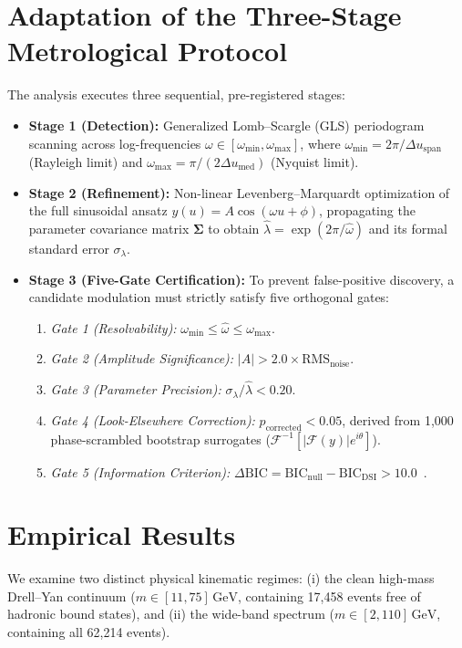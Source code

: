 \documentclass[11pt,a4paper]{article}
\begin{document}
\section{Adaptation of the Three-Stage Metrological Protocol}
The analysis executes three sequential, pre-registered stages:
\begin{itemize}
    \item \textbf{Stage 1 (Detection):} Generalized Lomb--Scargle (GLS) periodogram~\cite{lomb1976,scargle1982} scanning across log-frequencies $\omega \in [\omega_{\min}, \omega_{\max}]$, where $\omega_{\min} = 2\pi / \Delta u_{\text{span}}$ (Rayleigh limit) and $\omega_{\max} = \pi / (2 \Delta u_{\text{med}})$ (Nyquist limit).
    \item \textbf{Stage 2 (Refinement):} Non-linear Levenberg--Marquardt optimization of the full sinusoidal ansatz $y(u) = A \cos(\omega u + \phi)$, propagating the parameter covariance matrix $\boldsymbol{\Sigma}$ to obtain $\hat{\lambda} = \exp(2\pi / \hat{\omega})$ and its formal standard error $\sigma_\lambda$.
    \item \textbf{Stage 3 (Five-Gate Certification):} To prevent false-positive discovery, a candidate modulation must strictly satisfy five orthogonal gates:
    \begin{enumerate}
        \item \textit{Gate 1 (Resolvability):} $\omega_{\min} \le \hat{\omega} \le \omega_{\max}$.
        \item \textit{Gate 2 (Amplitude Significance):} $|A| > 2.0 \times \text{RMS}_{\text{noise}}$.
        \item \textit{Gate 3 (Parameter Precision):} $\sigma_\lambda / \hat{\lambda} < 0.20$.
        \item \textit{Gate 4 (Look-Elsewhere Correction):} $p_{\text{corrected}} < 0.05$, derived from 1,000 phase-scrambled bootstrap surrogates ($\mathcal{F}^{-1}[ |\mathcal{F}(y)| e^{i\theta} ]$).
        \item \textit{Gate 5 (Information Criterion):} $\Delta\text{BIC} = \text{BIC}_{\text{null}} - \text{BIC}_{\text{DSI}} > 10.0$~\cite{schwarz1978}.
    \end{enumerate}
\end{itemize}

\section{Empirical Results}
We examine two distinct physical kinematic regimes: (i) the clean high-mass Drell--Yan continuum ($m \in [11, 75]\,\text{GeV}$, containing 17,458 events free of hadronic bound states), and (ii) the wide-band spectrum ($m \in [2, 110]\,\text{GeV}$, containing all 62,214 events).
\end{document}
